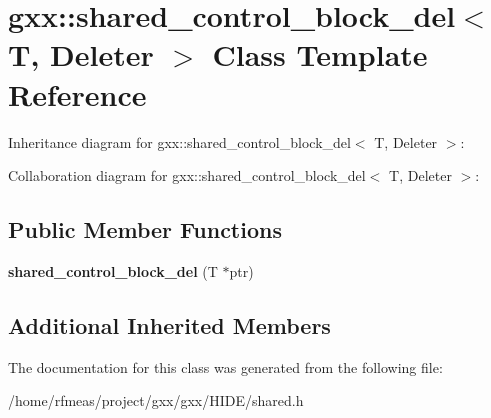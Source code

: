 \hypertarget{classgxx_1_1shared__control__block__del}{}\section{gxx\+:\+:shared\+\_\+control\+\_\+block\+\_\+del$<$ T, Deleter $>$ Class Template Reference}
\label{classgxx_1_1shared__control__block__del}


Inheritance diagram for gxx\+:\+:shared\+\_\+control\+\_\+block\+\_\+del$<$ T, Deleter $>$\+:


Collaboration diagram for gxx\+:\+:shared\+\_\+control\+\_\+block\+\_\+del$<$ T, Deleter $>$\+:
\subsection*{Public Member Functions}
\begin{DoxyCompactItemize}
\item 
{\bfseries shared\+\_\+control\+\_\+block\+\_\+del} (T $\ast$ptr)\hypertarget{classgxx_1_1shared__control__block__del_af2ad77cdc74c8c58e08a3201d338ae68}{}\label{classgxx_1_1shared__control__block__del_af2ad77cdc74c8c58e08a3201d338ae68}

\end{DoxyCompactItemize}
\subsection*{Additional Inherited Members}


The documentation for this class was generated from the following file\+:\begin{DoxyCompactItemize}
\item 
/home/rfmeas/project/gxx/gxx/\+H\+I\+D\+E/shared.\+h\end{DoxyCompactItemize}

